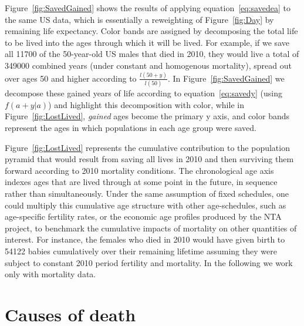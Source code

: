 \documentclass{article}
\begin{document}
Figure~\ref{fig:SavedGained} shows the results of applying
equation~\eqref{eq:savedea} to the same US data, which is essentially a
reweighting of Figure~\ref{fig:Day} by remaining life expectancy. Color bands
are assigned by decomposing the total life to be lived into the ages through
which it will be lived. For example, if we save all 11700 of the 50-year-old US
males that died in 2010, they would live a total of 349000 combined years (under constant and
homogenous mortality), spread out over ages 50 and higher according to $\frac{l(50+y)}{l(50)}$. In Figure~\ref{fig:SavedGained} we decompose these
gained years of life according to equation~\eqref{eq:savedy} (using $f(a+y|a)$)
and highlight this decomposition with color, while in Figure~\ref{fig:LostLived}, \textit{gained} ages become the primary y axis,
and color bands represent the ages in which populations in each age group were
saved. 

Figure~\ref{fig:LostLived} represents the cumulative contribution to the
population pyramid that would result from saving all lives in 2010 and then
surviving them forward according to 2010 mortality conditions. The chronological
age axis indexes ages that are lived through at some point in the
future, in sequence rather than simultaneously. Under the same assumption of
fixed schedules, one could multiply this cumulative age structure with other
age-schedules, such as age-specific fertility rates, or the economic age profiles produced by
the NTA project, to benchmark the cumulative impacts of mortality on other
quantities of interest. For instance, the females
who died in 2010 would have given birth to 54122 babies cumulatively over their
remaining lifetime assuming they were subject to constant 2010 period fertility
 and mortality. In the
following we work only with mortality data.

\section*{Causes of death}
\end{document}
